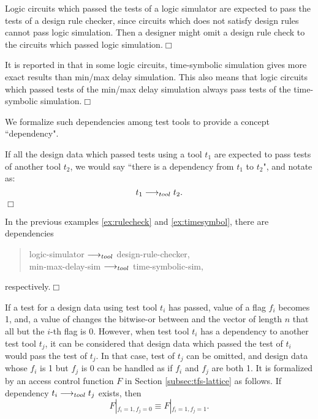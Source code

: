 \begin{example}\label{ex:rulecheck}
Logic circuits which passed the tests of a logic simulator are
expected to pass the tests of a design rule checker, since circuits
which does not satisfy design rules cannot pass logic simulation.
Then a designer might omit a design rule check to the circuits which
passed logic simulation.\hfill$\Box$
\end{example}

\begin{example}\label{ex:timesymbol}
It is reported in \cite{Ishiura:Jousho90} that in some logic circuits, 
time-symbolic simulation gives more exact results than min/max delay 
simulation.
This also means that logic circuits which passed tests of the min/max delay
simulation always pass tests of the time-symbolic simulation.\hfill$\Box$
\end{example}

We formalize such dependencies among test tools to provide a concept 
``\testtool dependency".
\begin{definition}\label{def:testtool-depend}
If all the design data which passed tests using a tool $t_1$ are 
expected to pass tests of another tool $t_2$,
we would say ``there is a \testtool dependency from $t_1$ to $t_2$", and
notate as:
\[ t_1 \longrightarrow_{tool} t_2 .\]\hfill$\Box$
\end{definition}

\begin{example}
In the previous examples \ref{ex:rulecheck} and \ref{ex:timesymbol}, 
there are \testtool dependencies 
\begin{quote}
logic-simulator $\longrightarrow_{tool}$ design-rule-checker,\\
min-max-delay-sim $\longrightarrow_{tool}$ time-symbolic-sim,
\end{quote} respectively.\hfill$\Box$
\end{example}

If a test for a design data using test tool $t_i$ has passed, value of 
a flag $f_i$ becomes 1, and, a value of \tfs changes  the bitwise-or 
between \tfs and the vector of length $n$ that all but the $i$-th 
flag is 0.
However, when test tool $t_i$ has a \testtool dependency to another 
test tool $t_j$,
it can be considered that design data which passed the test 
of $t_i$ would pass the test of $t_j$.
In that case, test of $t_j$ can be omitted, and design data whose $f_i$
is 1 but $f_j$ is 0 can be handled as if $f_i$ and $f_j$ are both 1.
It is formalized by an access control function $F$ in Section 
\ref{subsec:tfs-lattice} as follows.
If \testtool dependency $t_i \longrightarrow_{tool} t_j$ exists, then
\[ F\left|_{f_i=1,f_j=0} \right. \equiv F\left|_{f_i=1, f_j=1} \right. .\]

